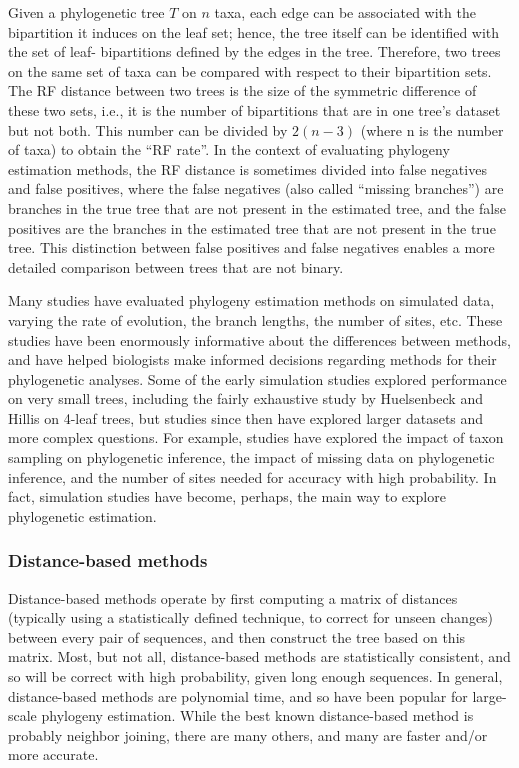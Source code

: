Given a phylogenetic tree $T$ on $n$ taxa, each edge can be associated 
with the bipartition it induces on the leaf set; hence, the tree 
itself can be identified with the set of leaf- bipartitions defined 
by the edges in the tree. Therefore, two trees on the same set 
of taxa can be compared with respect to their bipartition sets. 
The RF distance between two trees is the size of the symmetric difference 
of these two sets, i.e., it is the number of bipartitions that are in one 
tree's dataset but not both. This number can be divided by $2(n - 3)$ 
(where n is the number of taxa) to obtain the ``RF rate''. In the context 
of evaluating phylogeny estimation methods, the RF distance is sometimes 
divided into false negatives and false positives, where the false 
negatives (also called ``missing branches'') are branches in the 
true tree that are not present in the estimated tree, and the 
false positives are the branches in the estimated tree that are not 
present in the true tree. This distinction between false positives 
and false negatives enables a more detailed comparison between trees 
that are not binary.

Many studies have evaluated phylogeny estimation methods on simulated 
data, varying the rate of evolution, the branch lengths, the number 
of sites, etc. These studies have been enormously informative about 
the differences between methods, and have helped biologists make 
informed decisions regarding methods for their phylogenetic analyses. 
Some of the early simulation studies explored performance on very 
small trees, including the fairly exhaustive study by Huelsenbeck 
and Hillis on 4-leaf trees, but studies since then have explored 
larger datasets and more complex questions. For example, studies 
have explored the impact of taxon sampling on phylogenetic 
inference, the impact of missing data on phylogenetic inference, 
and the number of sites needed for accuracy with high probability. 
In fact, simulation studies have become, perhaps, the main way to 
explore phylogenetic estimation. 

\subsubsection{Distance-based methods} \label{methods}
Distance-based methods operate by first computing a matrix of 
distances (typically using a statistically defined technique, 
to correct for unseen changes) between every pair of sequences, 
and then construct the tree based on this matrix. Most, but not all, 
distance-based methods are statistically consistent, and so will 
be correct with high probability, given long enough sequences. 
In general, distance-based methods are polynomial time, and so 
have been popular for large-scale phylogeny estimation. 
While the best known distance-based method is probably neighbor 
joining, there are many others, and many are faster and/or 
more accurate. 

